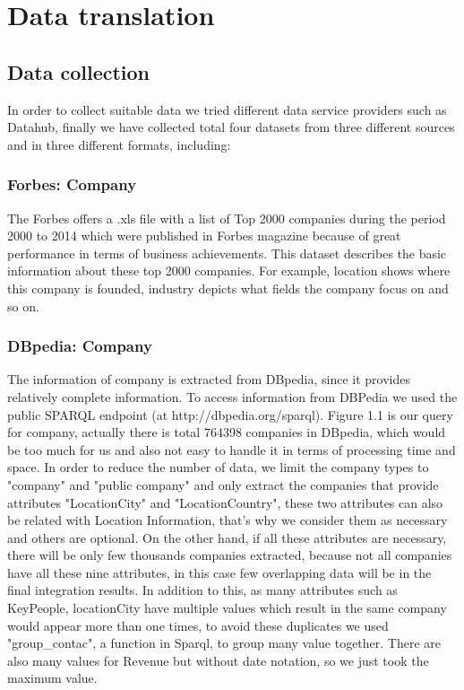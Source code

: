 \section{Data translation}
\subsection{Data collection}
In order to collect suitable data we tried different data service providers such as Datahub, finally we have collected total four datasets from three different sources and in three different formats, including: 





\subsubsection{Forbes: Company}
The Forbes offers a .xls file with a list of Top 2000 companies during the period 2000 to 2014 which were published in Forbes magazine because of great performance in terms of business achievements. This dataset describes the basic information about these top 2000 companies. For example, location shows where this company is founded, industry depicts what fields the company focus on and so on.
\subsubsection{DBpedia: Company }
The information of company is extracted from DBpedia, since it provides relatively complete information.  To access information from DBPedia we used the public SPARQL endpoint (at http://dbpedia.org/sparql). Figure 1.1 is our query for company, actually there is total 764398 companies in DBpedia, which would be too much for us and also not easy to handle it in terms of processing time and space. In order to reduce the number of data, we limit the company types to "company" and "public company" and only extract the companies that provide attributes "LocationCity" and "LocationCountry", these two attributes can also be related with Location Information, that's why we consider them as necessary and others are optional. On the other hand, if all these attributes are necessary, there will be only few thousands companies extracted, because not all companies have all these nine attributes, in this case few overlapping data will be in the final integration results. In addition to this, as many attributes such as KeyPeople, locationCity have multiple values which result in the same company would appear more than one times, to avoid these duplicates we used "group\_contac", a function in Sparql, to group many value together. There are also many values for Revenue but without date notation, so we just took the maximum value. 

